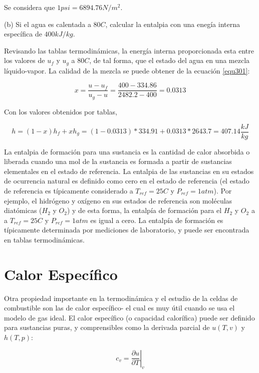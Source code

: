\documentclass[12pt]{book}
\theoremstyle{definition}
\theoremstyle{remark}
\theoremstyle{plain}
\begin{document}
Se considera que $1 psi = 6894.76 N/m^2$.

(b) Si el agua es calentada a $80 C$, calcular la entalpia con una enegía interna 
específica de $400 kJ/kg$.

Revisando las tablas termodinámicas, la energía interna proporcionada esta entre los valores 
de $u_f$ y $u_g$ a $80C$, de tal forma,  que el estado del agua en una mezcla líquido-vapor.
La calidad de la mezcla se puede obtener de la ecuación \ref{equ301}:

\begin{equation}
 x = \frac{u-u_f}{u_g-u}=\frac{400-334.86}{2482.2-400}=0.0313
\end{equation}

Con los valores obtenidos por tablas,

\begin{equation}
 h = (1-x) h_f + x h_g= (1-0.0313)*334.91+0.0313*2643.7= 407.14 \frac{kJ}{kg}
\end{equation}


La entalpia de formación para una sustancia es la cantidad de calor absorbida 
o liberada cuando una mol de la sustancia es formada a partir de sustancias 
elementales en el estado de referencia. La entalpia de las sustancias en su estados 
de ocurrencia natural es definido como cero en el estado de referencia (el estado de 
referencia es típicamente considerado a $T_{ref}=25 C$ y $P_{ref}= 1 atm$). Por ejemplo, 
el hidrógeno y oxígeno en sus estados de referencia son moléculas diatómicas ($H_2$ y 
$O_2$) y de esta forma, la entalpía de formación para el $H_2$ y $O_2$ a a $T_{ref}=25 C$ y $P_{ref}= 1 atm$
es igual a cero. La entalpía de formación es típicamente determinada por mediciones de
laboratorio, y puede ser encontrada en tablas termodinámicas.

\section{Calor Específico}

Otra propiedad importante en la termodinámica y el estudio de la celdas de combustible
son las de calor específico- el cual es muy útil cuando se usa el modelo de gas ideal. El
calor específico (o capacidad calorífica) puede ser definido para sustancias puras, y
comprensibles como la derivada parcial de $u(T, v)$ y $h(T, p)$:

\begin{equation}
 \label{equ303}
c_v = \left. \frac{\partial u}{\partial T}\right|_v
\end{equation}
\end{document}
